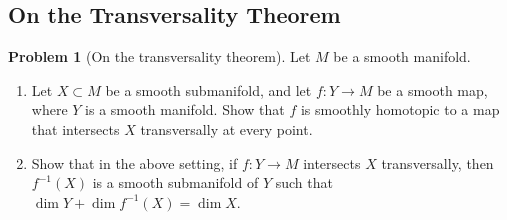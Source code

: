 \documentclass[reqno]{amsart}
\theoremstyle{definition}
\newtheorem{problem}[theorem]{Problem}
\theoremstyle{remark}
\begin{document}
    \subsection{On the Transversality Theorem}

    \begin{problem}[On the transversality theorem]
        Let $M$ be a smooth manifold.
        \begin{enumerate}
            \item Let $X \subset M$ be a smooth
                submanifold, and let $f \colon Y \to M$ 
                be a smooth map, where
                $Y$ is a smooth manifold. Show that
                $f$ is smoothly homotopic to a map that
                intersects $X$ transversally at every
                point.
            \item Show that in the above setting, if
                $f \colon Y \to M$ intersects $X$ transversally,
                then $f^{-1}(X)$ is a smooth submanifold
                of $Y$ such that $\dim Y + \dim
                f^{-1}(X) = \dim X$.
        \end{enumerate}
    \end{problem}



\printbibliography
\end{document}
